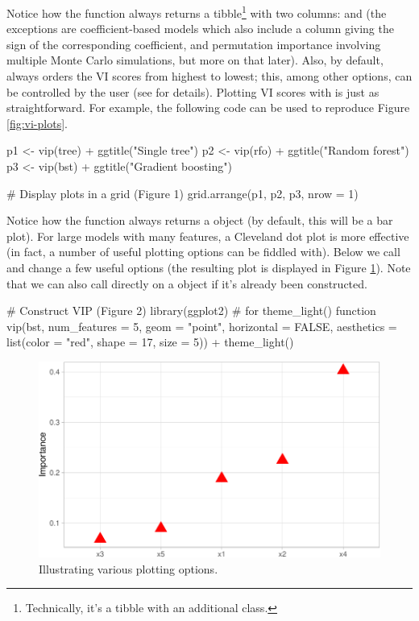 Notice how the  function always returns a
tibble\footnote{Technically, it's a tibble with an additional  class.}
with two columns:  and  (the exceptions
are coefficient-based models which also include a  column
giving the sign of the corresponding coefficient, and permutation
importance involving multiple Monte Carlo simulations, but more on that
later). Also, by default,  always orders the VI scores from
highest to lowest; this, among other options, can be controlled by the
user (see  for details). Plotting VI scores with
 is just as straightforward. For example, the following code
can be used to reproduce Figure \ref{fig:vi-plots}.

\begin{Schunk}
\begin{Sinput}
p1 <- vip(tree) + ggtitle("Single tree")
p2 <- vip(rfo) + ggtitle("Random forest")
p3 <- vip(bst) + ggtitle("Gradient boosting")

# Display plots in a grid (Figure 1)
grid.arrange(p1, p2, p3, nrow = 1)
\end{Sinput}
\end{Schunk}

Notice how the  function always returns a 
object (by default, this will be a bar plot). For large models with many
features, a Cleveland dot plot is more effective (in fact, a number of
useful plotting options can be fiddled with). Below we call 
and change a few useful options (the resulting plot is displayed in
Figure \ref{fig:dot-plot}). Note that we can also call 
directly on a  object if it's already been constructed.

\begin{Schunk}
\begin{Sinput}
# Construct VIP (Figure 2)
library(ggplot2)  # for theme_light() function
vip(bst, num_features = 5, geom = "point", horizontal = FALSE,
    aesthetics = list(color = "red", shape = 17, size = 5)) +
  theme_light()
\end{Sinput}
\begin{figure}[!htb]

{\centering \includegraphics[width=0.7\linewidth]{greenwell-boehmke_files/figure-latex/dot-plot-1}

}

\caption[Illustrating various plotting options]{Illustrating various plotting options.}\label{fig:dot-plot}
\end{figure}
\end{Schunk}


